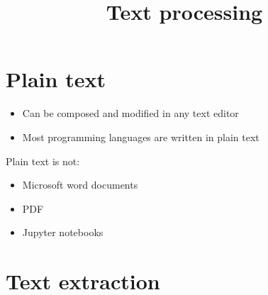 \documentclass[slides]{pgnotes}
\title{Text processing}
\begin{document}
\maketitle

\tableofcontents


\section{Plain text}

\begin{itemize}
\item Can be composed and modified in any text editor 
\item Most programming languages are written in plain text
\end{itemize}

Plain text is not:
\begin{itemize}
\item Microsoft word documents
\item PDF
\item Jupyter notebooks 
\end{itemize}


\section{Text extraction}
\end{document}

